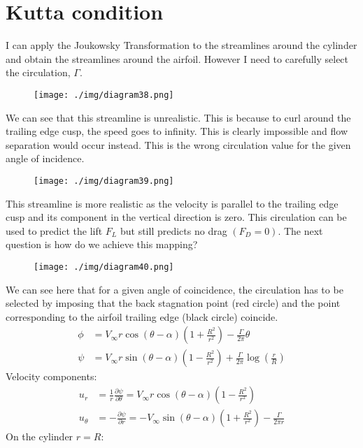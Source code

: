\section{Kutta condition}
I can apply the Joukowsky Transformation to the streamlines around the cylinder and obtain the streamlines around the airfoil. However I need to carefully select the circulation, $\Gamma$.
\begin{figure}[H]
  \centering
  \texttt{[image: ./img/diagram38.png]}
\end{figure}
We can see that this streamline is unrealistic. This is because to curl around the trailing edge cusp, the speed goes to infinity. This is clearly impossible and flow separation would occur instead. This is the wrong circulation value for the given angle of incidence.
\begin{figure}[H]
  \centering
  \texttt{[image: ./img/diagram39.png]}
\end{figure}
This streamline is more realistic as the velocity is parallel to the trailing edge cusp and its component in the vertical direction is zero. This circulation can be used to predict the lift $F_L$ but still predicts no drag $(F_D = 0)$. The next question is how do we achieve this mapping?
\begin{figure}[H]
  \centering
  \texttt{[image: ./img/diagram40.png]}
\end{figure}
We can see here that for a given angle of coincidence, the circulation has to be selected by imposing that the back stagnation point (red circle) and the point corresponding to the airfoil trailing edge (black circle) coincide.
\begin{align}
  \phi & = V_\infty r \cos{(\theta - \alpha )}\left(1 + \frac{R^2}{r^2}\right) - \frac{\Gamma}{2\pi}\theta                         \\
  \psi & = V_\infty r \sin{(\theta - \alpha)}\left(1 - \frac{R^2}{r^2}\right) + \frac{\Gamma}{2\pi} \log{\left(\frac{r}{R}\right)}
\end{align}
Velocity components:
\begin{align}
  u_r      & = \frac{1}{r} \frac{\partial \psi}{\partial \theta} = V_\infty r \cos{(\theta - \alpha)}\left(1-\frac{R^2}{r^2}\right)            \\
  u_\theta & = - \frac{\partial \psi}{\partial r} = -V_\infty \sin{(\theta - \alpha)} \left(1 + \frac{R^2}{r^2}\right) - \frac{\Gamma}{2\pi r}
\end{align}
On the cylinder $r = R$:
